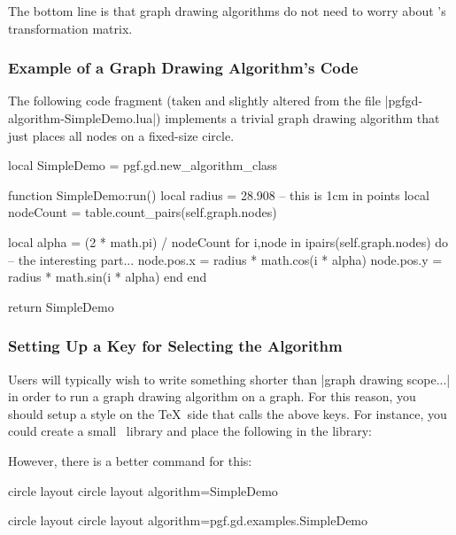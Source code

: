 The bottom line is that graph drawing algorithms do not need to worry
about \pgfname's transformation matrix.



\subsubsection{Example of a Graph Drawing Algorithm's Code}

The following code fragment (taken and slightly altered
from the file |pgfgd-algorithm-SimpleDemo.lua|)
implements a trivial graph drawing algorithm that just places all
nodes on a fixed-size circle.  



\begin{codeexample}
local SimpleDemo = pgf.gd.new_algorithm_class {}

function SimpleDemo:run()
  local radius = 28.908  -- this is 1cm in points
  local nodeCount = table.count_pairs(self.graph.nodes)

  local alpha = (2 * math.pi) / nodeCount
  for i,node in ipairs(self.graph.nodes) do
    -- the interesting part...
    node.pos.x = radius * math.cos(i * alpha)
    node.pos.y = radius * math.sin(i * alpha)
  end
end

return SimpleDemo
\end{codeexample}


\subsubsection{Setting Up a Key for Selecting the Algorithm}

Users will typically wish to write something shorter than
|graph drawing scope...| in order to run a graph drawing algorithm on
a graph. For this reason, you should setup a style on the \TeX\ side
that calls the above keys. For instance, you could create a small
\tikzname\ library and place the following in the library:

\begin{codeexample}
\end{codeexample}

However, there is a better command for this:

\begin{codeexample}[code only]
\pgfgddeclarealgorithmkey
{circle layout}
{circle layout}
{algorithm=SimpleDemo}
\end{codeexample}
\pgfgddeclarealgorithmkey
{circle layout}
{circle layout}
{algorithm=pgf.gd.examples.SimpleDemo}

